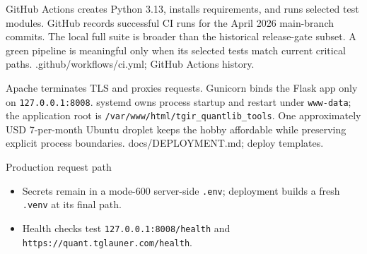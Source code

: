 {GitHub Actions creates Python 3.13, installs requirements, and runs selected test modules.}
{GitHub records successful CI runs for the April 2026 main-branch commits.}
{The local full suite is broader than the historical release-gate subset.}
{A green pipeline is meaningful only when its selected tests match current critical paths.}
{.github/workflows/ci.yml; GitHub Actions history.}

{Apache terminates TLS and proxies requests.}
{Gunicorn binds the Flask app only on \texttt{127.0.0.1:8008}.}
{systemd owns process startup and restart under \texttt{www-data}; the application root is \texttt{/var/www/html/tgir\_quantlib\_tools}.}
{One approximately USD 7-per-month Ubuntu droplet keeps the hobby affordable while preserving explicit process boundaries.}
{docs/DEPLOYMENT.md; deploy templates.}

\begin{frame}{Production request path}
  \centering
  \vspace{7mm}
  \begin{itemize}\setlength\itemsep{0.7em}
    \item Secrets remain in a mode-600 server-side \texttt{.env}; deployment builds a fresh \texttt{.venv} at its final path.
    \item Health checks test \texttt{127.0.0.1:8008/health} and \texttt{https://quant.tglauner.com/health}.
  \end{itemize}
\end{frame}

